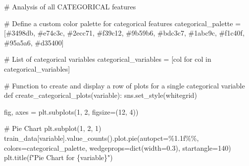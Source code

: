 \documentclass[
  letterpaper,
  DIV=11,
  numbers=noendperiod]{scrartcl}
\newenvironment{Shaded}{\begin{snugshade}}{\end{snugshade}}
\newcommand{\BuiltInTok}[1]{\textcolor[rgb]{0.00,0.23,0.31}{#1}}
\newcommand{\CommentTok}[1]{\textcolor[rgb]{0.37,0.37,0.37}{#1}}
\newcommand{\ControlFlowTok}[1]{\textcolor[rgb]{0.00,0.23,0.31}{#1}}
\newcommand{\DecValTok}[1]{\textcolor[rgb]{0.68,0.00,0.00}{#1}}
\newcommand{\FloatTok}[1]{\textcolor[rgb]{0.68,0.00,0.00}{#1}}
\newcommand{\KeywordTok}[1]{\textcolor[rgb]{0.00,0.23,0.31}{#1}}
\newcommand{\NormalTok}[1]{\textcolor[rgb]{0.00,0.23,0.31}{#1}}
\newcommand{\OperatorTok}[1]{\textcolor[rgb]{0.37,0.37,0.37}{#1}}
\newcommand{\SpecialCharTok}[1]{\textcolor[rgb]{0.37,0.37,0.37}{#1}}
\newcommand{\SpecialStringTok}[1]{\textcolor[rgb]{0.13,0.47,0.30}{#1}}
\newcommand{\StringTok}[1]{\textcolor[rgb]{0.13,0.47,0.30}{#1}}
\begin{document}
\begin{Shaded}
\begin{Highlighting}[]
\CommentTok{\# Analysis of all CATEGORICAL features}

\CommentTok{\# Define a custom color palette for categorical features}
\NormalTok{categorical\_palette }\OperatorTok{=}\NormalTok{ [}\StringTok{\textquotesingle{}\#3498db\textquotesingle{}}\NormalTok{, }\StringTok{\textquotesingle{}\#e74c3c\textquotesingle{}}\NormalTok{, }\StringTok{\textquotesingle{}\#2ecc71\textquotesingle{}}\NormalTok{, }\StringTok{\textquotesingle{}\#f39c12\textquotesingle{}}\NormalTok{, }\StringTok{\textquotesingle{}\#9b59b6\textquotesingle{}}\NormalTok{, }\StringTok{\textquotesingle{}\#bdc3c7\textquotesingle{}}\NormalTok{, }\StringTok{\textquotesingle{}\#1abc9c\textquotesingle{}}\NormalTok{, }\StringTok{\textquotesingle{}\#f1c40f\textquotesingle{}}\NormalTok{, }\StringTok{\textquotesingle{}\#95a5a6\textquotesingle{}}\NormalTok{, }\StringTok{\textquotesingle{}\#d35400\textquotesingle{}}\NormalTok{]}

\CommentTok{\# List of categorical variables}
\NormalTok{categorical\_variables }\OperatorTok{=}\NormalTok{ [col }\ControlFlowTok{for}\NormalTok{ col }\KeywordTok{in}\NormalTok{ categorical\_variables]}

\CommentTok{\# Function to create and display a row of plots for a single categorical variable}
\KeywordTok{def}\NormalTok{ create\_categorical\_plots(variable):}
\NormalTok{    sns.set\_style(}\StringTok{\textquotesingle{}whitegrid\textquotesingle{}}\NormalTok{)}
    
\NormalTok{    fig, axes }\OperatorTok{=}\NormalTok{ plt.subplots(}\DecValTok{1}\NormalTok{, }\DecValTok{2}\NormalTok{, figsize}\OperatorTok{=}\NormalTok{(}\DecValTok{12}\NormalTok{, }\DecValTok{4}\NormalTok{))}

    \CommentTok{\# Pie Chart}
\NormalTok{    plt.subplot(}\DecValTok{1}\NormalTok{, }\DecValTok{2}\NormalTok{, }\DecValTok{1}\NormalTok{)}
\NormalTok{    train\_data[variable].value\_counts().plot.pie(autopct}\OperatorTok{=}\StringTok{\textquotesingle{}}\SpecialCharTok{\%1.1f\%\%}\StringTok{\textquotesingle{}}\NormalTok{,}
\NormalTok{                                                 colors}\OperatorTok{=}\NormalTok{categorical\_palette, }
\NormalTok{                                                 wedgeprops}\OperatorTok{=}\BuiltInTok{dict}\NormalTok{(width}\OperatorTok{=}\FloatTok{0.3}\NormalTok{), }
\NormalTok{                                                 startangle}\OperatorTok{=}\DecValTok{140}\NormalTok{)}
\NormalTok{    plt.title(}\SpecialStringTok{f"Pie Chart for }\SpecialCharTok{\{}\NormalTok{variable}\SpecialCharTok{\}}\SpecialStringTok{"}\NormalTok{)}


\end{Highlighting}
\end{Shaded}
\end{document}
